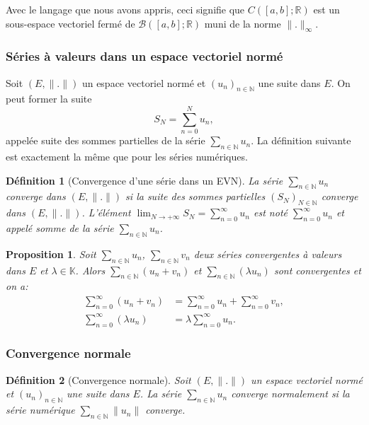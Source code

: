 \documentclass{article}
\newtheorem{proposition}[theorem]{Proposition}
\newtheorem{definition}{Définition}
\begin{document}
Avec le langage que nous avons appris, ceci signifie que $C([a, b]; \mathbb{R})$ est un sous-espace vectoriel fermé de $\mathcal{B}([a, b]; \mathbb{R})$ muni de la norme $\|.\|_\infty$.

\subsubsection{Séries à valeurs dans un espace vectoriel normé}

Soit $(E, \|.\|)$ un espace vectoriel normé et $(u_n)_{n \in \mathbb{N}}$ une suite dans $E$. On peut former la suite
\begin{equation}
    S_N = \sum_{n=0}^N u_n,
\end{equation}
appelée suite des sommes partielles de la série $\sum_{n \in \mathbb{N}} u_n$. La définition suivante est exactement la même que pour les séries numériques.

\begin{definition}[Convergence d'une série dans un EVN]
\label{def:series_convergence_evn}
La série $\sum_{n \in \mathbb{N}} u_n$ converge dans $(E, \|.\|)$ si la suite des sommes partielles $(S_N)_{N \in \mathbb{N}}$ converge dans $(E, \|.\|)$. L'élément $\lim_{N \rightarrow +\infty} S_N = \sum_{n=0}^\infty u_n$ est noté $\sum_{n=0}^\infty u_n$ et appelé somme de la série $\sum_{n \in \mathbb{N}} u_n$.
\end{definition}

\begin{proposition}
\label{prop:series_linearity}
Soit $\sum_{n \in \mathbb{N}} u_n$, $\sum_{n \in \mathbb{N}} v_n$ deux séries convergentes à valeurs dans $E$ et $\lambda \in \mathbb{K}$. Alors $\sum_{n \in \mathbb{N}} (u_n + v_n)$ et $\sum_{n \in \mathbb{N}} (\lambda u_n)$ sont convergentes et on a:
\begin{align*}
    \sum_{n=0}^\infty (u_n + v_n) &= \sum_{n=0}^\infty u_n + \sum_{n=0}^\infty v_n, \\
    \sum_{n=0}^\infty (\lambda u_n) &= \lambda \sum_{n=0}^\infty u_n.
\end{align*}
\end{proposition}

\subsubsection{Convergence normale}

\begin{definition}[Convergence normale]
\label{def:normal_convergence}
Soit $(E, \|.\|)$ un espace vectoriel normé et $(u_n)_{n \in \mathbb{N}}$ une suite dans $E$. La série $\sum_{n \in \mathbb{N}} u_n$ converge normalement si la série numérique $\sum_{n \in \mathbb{N}} \|u_n\|$ converge.
\end{definition}
\end{document}

